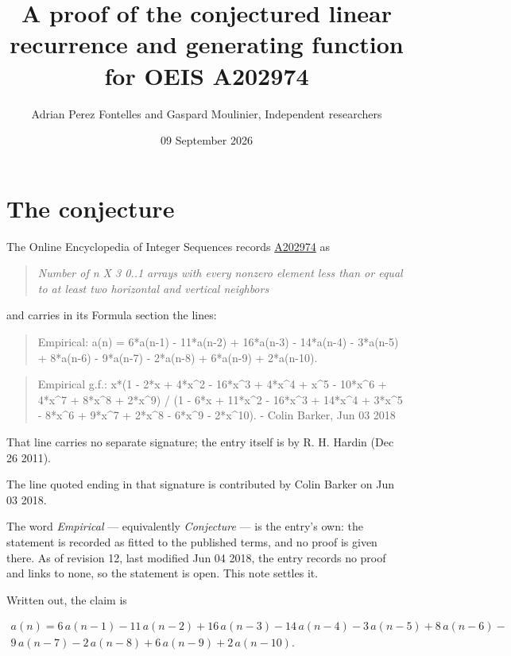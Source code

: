 \documentclass[11pt]{article}
\title{A proof of the conjectured linear recurrence and generating function for OEIS A202974}
\author{Adrian Perez Fontelles and Gaspard Moulinier, Independent researchers}
\date{09 September 2026}
\theoremstyle{definition}
\begin{document}
\maketitle
\section{The conjecture}

The Online Encyclopedia of Integer Sequences records \href{https://oeis.org/A202974}{A202974} as

\begin{quote}\itshape Number of n X 3 0..1 arrays with every nonzero element less than or equal to at least two horizontal and vertical neighbors\end{quote}

and carries in its Formula section the lines:

\begin{quote}\ttfamily Empirical: a(n) = 6*a(n-1) - 11*a(n-2) + 16*a(n-3) - 14*a(n-4) - 3*a(n-5) + 8*a(n-6) - 9*a(n-7) - 2*a(n-8) + 6*a(n-9) + 2*a(n-10).\end{quote}

\begin{quote}\ttfamily Empirical g.f.: x*(1 - 2*x + 4*x\textasciicircum{}2 - 16*x\textasciicircum{}3 + 4*x\textasciicircum{}4 + x\textasciicircum{}5 - 10*x\textasciicircum{}6 + 4*x\textasciicircum{}7 + 8*x\textasciicircum{}8 + 2*x\textasciicircum{}9) / (1 - 6*x + 11*x\textasciicircum{}2 - 16*x\textasciicircum{}3 + 14*x\textasciicircum{}4 + 3*x\textasciicircum{}5 - 8*x\textasciicircum{}6 + 9*x\textasciicircum{}7 + 2*x\textasciicircum{}8 - 6*x\textasciicircum{}9 - 2*x\textasciicircum{}10). - Colin Barker, Jun 03 2018\end{quote}

That line carries no separate signature; the entry itself is by R. H. Hardin (Dec 26 2011).

The line quoted ending in that signature is contributed by Colin Barker on Jun 03 2018.

The word {\itshape Empirical} --- equivalently {\itshape Conjecture} --- is the entry's own: the statement is recorded as fitted to the published terms, and no proof is given there. As of revision 12, last modified Jun 04 2018, the entry records no proof and links to none, so the statement is open. This note settles it.

Written out, the claim is

\begin{multline*} a(n) = 6\,a(n-1) - 11\,a(n-2) + 16\,a(n-3) - 14\,a(n-4) - 3\,a(n-5) + 8\,a(n-6) - \\ 9\,a(n-7) - 2\,a(n-8) + 6\,a(n-9) + 2\,a(n-10). \end{multline*}
\end{document}
